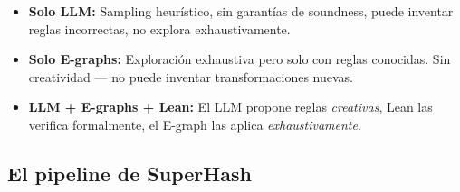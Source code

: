 \documentclass[11pt,a4paper]{article}
\begin{document}
\begin{itemize}[nosep]
  \item \textbf{Solo LLM:} Sampling heurístico, sin garantías de soundness, puede inventar reglas incorrectas, no explora exhaustivamente.
  \item \textbf{Solo E-graphs:} Exploración exhaustiva pero solo con reglas conocidas. Sin creatividad --- no puede inventar transformaciones nuevas.
  \item \textbf{LLM + E-graphs + Lean:} El LLM propone reglas \emph{creativas}, Lean las verifica formalmente, el E-graph las aplica \emph{exhaustivamente}.
\end{itemize}

\subsection{El pipeline de SuperHash}
\end{document}
